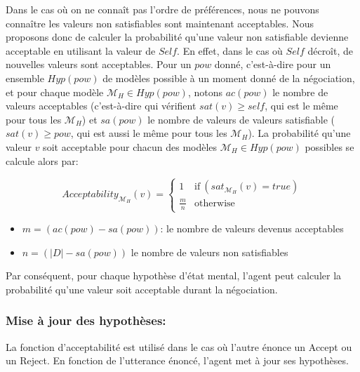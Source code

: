 \documentclass{llncs}
\begin{document}
	Dans le cas où on ne connaît pas l'ordre de préférences, nous ne pouvons connaître les valeurs non satisfiables sont maintenant acceptables. Nous proposons donc de calculer la probabilité qu'une valeur non satisfiable devienne acceptable en utilisant la valeur de $Self$. En effet, dans le cas où $Self$ décroît, de nouvelles valeurs sont acceptables. Pour un $pow$ donné, c'est-à-dire pour un ensemble $Hyp(pow)$ de modèles possible à un moment donné de la négociation, et pour chaque modèle $\mathcal{M}_H\in Hyp(pow)$, notons $ac(pow)$ le nombre de valeurs acceptables (c'est-à-dire qui vérifient $sat(v)\geq self$, qui est le même pour tous les $\mathcal{M}_H$) et $sa(pow)$ le nombre de valeurs de valeurs satisfiable ($sat(v)\geq pow$, qui est aussi le même pour tous les $\mathcal{M}_H$). La probabilité qu'une valeur $v$ soit acceptable pour chacun des modèles $\mathcal{M}_H\in Hyp(pow)$ possibles se calcule alors par:
	
	
	
	
	\begin{equation}
	Acceptability_{\mathcal{M}_H}(v) =  \left\{\begin{array}{ll}
	1 & \mathrm{if\ } (sat_{\mathcal{M}_H}(v) = true)\\
	\frac{m}{n} & \mathrm{otherwise}
	\end{array}\right.
	\end{equation}
	\begin{itemize}
		\item $m= (ac(pow) - sa(pow)) $: le nombre de valeurs devenus acceptables
		\item $n= (|D| - sa(pow)) $ le nombre de valeurs non satisfiables
	\end{itemize}
	
	Par conséquent, pour chaque hypothèse d'état mental, l'agent peut calculer la probabilité qu'une valeur soit acceptable durant la négociation.
	
	\subsubsection{Mise à jour des hypothèses:}
		La fonction d'acceptabilité est utilisé dans le cas où l'autre énonce un Accept ou un Reject. En fonction de l'utterance énoncé, l'agent met à jour ses hypothèses. 
		
\end{document}
